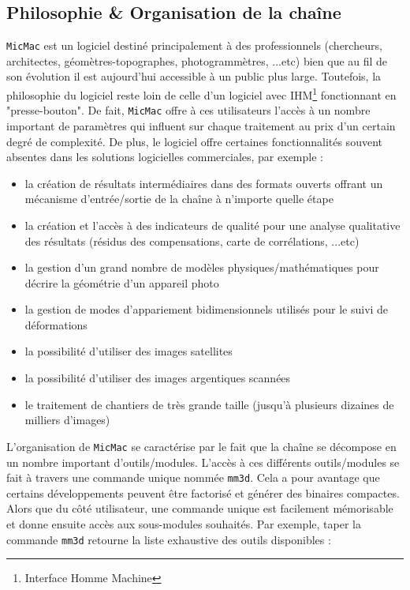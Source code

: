 \subsection{Philosophie \& Organisation de la chaîne}\label{subsec_organisation}
{\tt MicMac} est un logiciel destiné principalement à des professionnels (chercheurs, architectes, géomètres-topographes, photogrammètres, ...etc) bien que au fil de son évolution il est aujourd'hui accessible à un public plus large. Toutefois, la philosophie du logiciel reste loin de celle d'un logiciel avec IHM\footnote{Interface Homme Machine} fonctionnant en "presse-bouton". De fait, {\tt MicMac} offre à ces utilisateurs l'accès à un nombre important de paramètres qui influent sur chaque traitement au prix d'un certain degré de complexité. De plus, le logiciel offre certaines fonctionnalités souvent absentes dans les solutions logicielles commerciales, par exemple :

\begin{itemize}
\item la création de résultats intermédiaires dans des formats ouverts offrant un mécanisme d'entrée/sortie de la chaîne à n'importe quelle étape
\item la création et l'accès à des indicateurs de qualité pour une analyse qualitative des résultats (résidus des compensations, carte de corrélations, ...etc)
\item la gestion d'un grand nombre de modèles physiques/mathématiques pour décrire la géométrie d'un appareil photo
\item la gestion de modes d'appariement bidimensionnels utilisés pour le suivi de déformations
\item la possibilité d'utiliser des images satellites
\item la possibilité d'utiliser des images argentiques scannées
\item le traitement de chantiers de très grande taille (jusqu'à plusieurs dizaines de milliers d'images)
\end{itemize}

L'organisation de {\tt MicMac} se caractérise par le fait que la chaîne se décompose en un nombre important d'outils/modules. L'accès à ces différents outils/modules se fait à travers une commande unique nommée {\tt mm3d}. Cela a pour avantage que certains développements peuvent être factorisé et générer des binaires compactes. Alors que du côté utilisateur, une commande unique est facilement mémorisable et donne ensuite accès aux sous-modules souhaités. Par exemple, taper la commande {\tt mm3d} retourne la liste exhaustive des outils disponibles :

